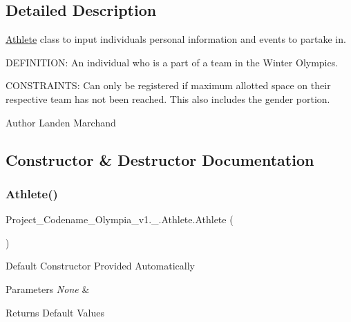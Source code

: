 \subsection{Detailed Description}
\hyperlink{classProject__Codename__Olympia__v1_1_1__0_1_1Athlete}{Athlete} class to input individual\textquotesingle{}s personal information and events to partake in. 

D\+E\+F\+I\+N\+I\+T\+I\+ON\+: An individual who is a part of a team in the Winter Olympics.

C\+O\+N\+S\+T\+R\+A\+I\+N\+TS\+: Can only be registered if maximum allotted space on their respective team has not been reached. This also includes the gender portion.\begin{DoxyAuthor}{Author}
Landen Marchand 
\end{DoxyAuthor}


\subsection{Constructor \& Destructor Documentation}
\mbox{\label{classProject__Codename__Olympia__v1_1_1__0_1_1Athlete_a9f7a395fab9d43787087a2041a4b7507}} 
\subsubsection{\texorpdfstring{Athlete()}{Athlete()}}
{\footnotesize\ttfamily Project\+\_\+\+Codename\+\_\+\+Olympia\+\_\+v1.\+\_.\+Athlete.\+Athlete (\begin{DoxyParamCaption}{ }\end{DoxyParamCaption})\hspace{0.3cm}{\ttfamily [inline]}}

Default Constructor Provided Automatically 
\begin{DoxyParams}{Parameters}
{\em None} & \\
\hline
\end{DoxyParams}
\begin{DoxyReturn}{Returns}
Default Values 
\end{DoxyReturn}


